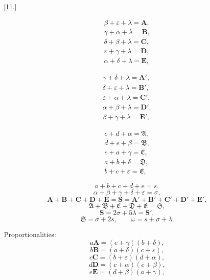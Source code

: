 
\clearpage\begin{center}[11.]\end{center}

\noindent\begin{minipage}[t]{.46\textwidth}
\vspace{0pt}
\[
\begin{gathered}
\beta+\varepsilon+\lambda=\boldsymbol{A}, \\
\gamma+\alpha+\lambda=\boldsymbol{B}, \\
\delta+\beta+\lambda=\boldsymbol{C}, \\
\varepsilon+\gamma+\lambda=\boldsymbol{D}, \\
\alpha+\delta+\lambda=\boldsymbol{E},
\end{gathered}
\]

\[
\begin{gathered}
\gamma+\delta+\lambda=\boldsymbol{A}', \\
\delta+\varepsilon+\lambda=\boldsymbol{B}', \\
\varepsilon+\alpha+\lambda=\boldsymbol{C}', \\
\alpha+\beta+\lambda=\boldsymbol{D}', \\
\beta+\gamma+\lambda=\boldsymbol{E}',
\end{gathered}
\]

\end{minipage}\hfill\begin{minipage}[t]{.50\textwidth}
\vspace{0pt}
\begin{center}\resizebox{5.1cm}{!}{}\end{center}

\[
\begin{gathered}
c+d+\alpha=\mathfrak{A}, \\
d+e+\beta=\mathfrak{B}, \\
e+a+\gamma=\mathfrak{C}, \\
a+b+\delta=\mathfrak{D}, \\
b+c+\varepsilon=\mathfrak{E},
\end{gathered}
\]
\end{minipage}


\[
a+b+c+d+e=s,
\]
\[
\alpha+\beta+\gamma+\delta+\varepsilon=\sigma,
\]
\[
\boldsymbol{A}+\boldsymbol{B}+\boldsymbol{C}+\boldsymbol{D}+\boldsymbol{E}=\boldsymbol{S}=\boldsymbol{A}'+\boldsymbol{B}'+\boldsymbol{C}'+\boldsymbol{D}'+\boldsymbol{E}',
\]
\[
\mathfrak{A}+\mathfrak{B}+\mathfrak{C}+\mathfrak{D}+\mathfrak{E}=\mathfrak{S},
\]
\[
\boldsymbol{S}=2\sigma+5\lambda=\boldsymbol{S}',
\]
\[
\mathfrak{S}=\sigma+2s, \qquad \omega=s+\sigma+\lambda.
\]

Proportionalities:
\[
a\boldsymbol{A}=(e+\gamma)(b+\delta),
\]
\[
b\boldsymbol{B}=(a+\delta)(c+\varepsilon),
\]
\[
c\boldsymbol{C}=(b+\varepsilon)(d+\alpha),
\]
\[
d\boldsymbol{D}=(c+\alpha)(e+\beta),
\]
\[
e\boldsymbol{E}=(d+\beta)(a+\gamma),
\]
